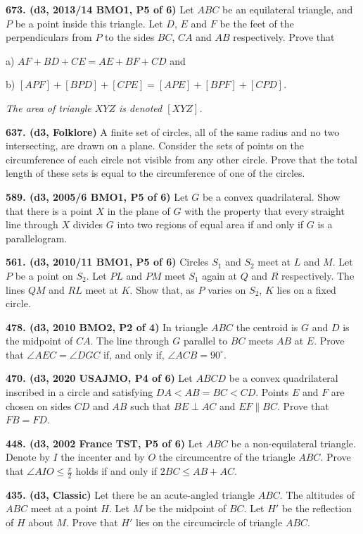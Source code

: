 \documentclass{article}
\begin{document}
\textbf{673. (\color{red}d3\color{black}, 2013/14 BMO1, P5 of 6)} Let $ABC$ be an equilateral triangle, and $P$ be a point inside this triangle. Let $D$, $E$ and $F$ be the feet of the perpendiculars from $P$ to the sides $BC$, $CA$ and $AB$ respectively. Prove that

a) $AF+BD+CE=AE+BF+CD$ and

b) $[APF]+[BPD]+[CPE]=[APE]+[BPF]+[CPD]$.

\emph{The area of triangle $XYZ$ is denoted $[XYZ]$.}

\textbf{637. (\color{red}d3\color{black}, Folklore)} A finite set of circles, all of the same radius and no two intersecting, are drawn on a plane. Consider the sets of points on the circumference of each circle not visible from any other circle. Prove that the total length of these sets is equal to the circumference of one of the circles.

\textbf{589. (\color{red}d3\color{black}, 2005/6 BMO1, P5 of 6)} Let $G$ be a convex quadrilateral. Show that there is a point $X$ in the plane of $G$ with the property that every straight line through $X$ divides $G$ into two regions of equal area if and only if $G$ is a parallelogram.

\textbf{561. (\color{red}d3\color{black}, 2010/11 BMO1, P5 of 6)} Circles $S_1$ and $S_2$ meet at $L$ and $M$. Let $P$ be a point on $S_2$. Let $PL$ and $PM$ meet $S_1$ again at $Q$ and $R$ respectively. The lines $QM$ and $RL$ meet at $K$. Show that, as $P$ varies on $S_2$, $K$ lies on a fixed circle.

\textbf{478. (\color{red}d3\color{black}, 2010 BMO2, P2 of 4)} In triangle $ABC$ the centroid is $G$ and $D$ is the midpoint of $CA$. The line through $G$ parallel to $BC$ meets $AB$ at $E$. Prove that $\angle AEC = \angle DGC$ if, and only if, $\angle ACB = 90^\circ$.

\textbf{470. (\color{red}d3\color{black}, 2020 USAJMO, P4 of 6)}  Let $ABCD$ be a convex quadrilateral inscribed in a circle and satisfying $DA < AB = BC < CD$. Points $E$ and $F$ are chosen on sides $CD$ and $AB$ such that $BE \perp AC$ and $EF \parallel BC$. Prove that $FB = FD$.


\textbf{448. (\color{red}d3\color{black}, 2002 France TST, P5 of 6)} Let $ABC$ be a non-equilateral triangle. Denote by $I$ the incenter and by $O$ the circumcentre of the triangle $ABC.$ Prove that $\angle AIO \leq \frac{\pi}{2}$ holds if and only if $2 BC \leq AB + AC.$

\textbf{435. (\color{red}d3\color{black}, Classic)} Let there be an acute-angled triangle $ABC$. The altitudes of $ABC$ meet at a point $H$. Let $M$ be the midpoint of $BC$. Let $H'$ be the reflection of $H$ about $M$. Prove that $H'$ lies on the circumcircle of triangle $ABC$.
\end{document}
